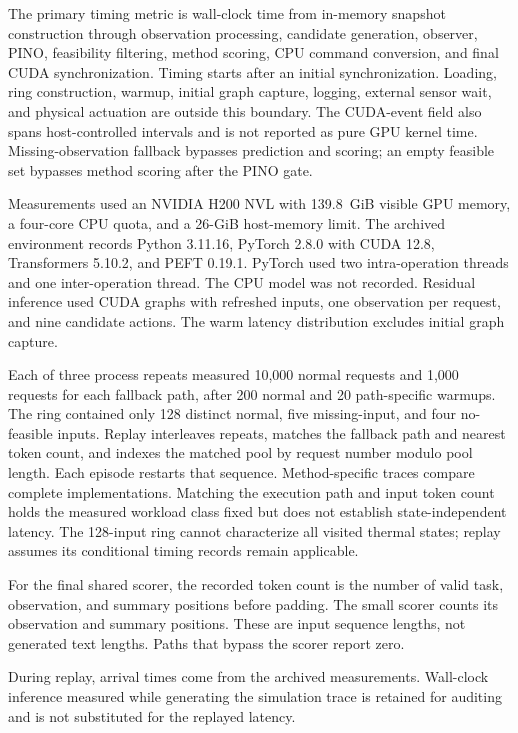 The primary timing metric is wall-clock time from in-memory snapshot construction through observation processing, candidate generation, observer, PINO, feasibility filtering, method scoring, CPU command conversion, and final CUDA synchronization. Timing starts after an initial synchronization. Loading, ring construction, warmup, initial graph capture, logging, external sensor wait, and physical actuation are outside this boundary. The CUDA-event field also spans host-controlled intervals and is not reported as pure GPU kernel time. Missing-observation fallback bypasses prediction and scoring; an empty feasible set bypasses method scoring after the PINO gate.

Measurements used an NVIDIA H200 NVL with 139.8~GiB visible GPU memory, a four-core CPU quota, and a 26-GiB host-memory limit. The archived environment records Python 3.11.16, PyTorch 2.8.0 with CUDA 12.8, Transformers 5.10.2, and PEFT 0.19.1. PyTorch used two intra-operation threads and one inter-operation thread. The CPU model was not recorded. Residual inference used CUDA graphs with refreshed inputs, one observation per request, and nine candidate actions. The warm latency distribution excludes initial graph capture.

Each of three process repeats measured 10,000 normal requests and 1,000 requests for each fallback path, after 200 normal and 20 path-specific warmups. The ring contained only 128 distinct normal, five missing-input, and four no-feasible inputs. Replay interleaves repeats, matches the fallback path and nearest token count, and indexes the matched pool by request number modulo pool length. Each episode restarts that sequence. Method-specific traces compare complete implementations. Matching the execution path and input token count holds the measured workload class fixed but does not establish state-independent latency. The 128-input ring cannot characterize all visited thermal states; replay assumes its conditional timing records remain applicable.

For the final shared scorer, the recorded token count is the number of valid task, observation, and summary positions before padding. The small scorer counts its observation and summary positions. These are input sequence lengths, not generated text lengths. Paths that bypass the scorer report zero.

During replay, arrival times come from the archived measurements. Wall-clock inference measured while generating the simulation trace is retained for auditing and is not substituted for the replayed latency.




